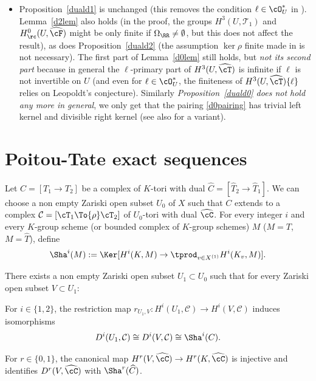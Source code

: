 \begin{rema}
\begin{itemize}
\item Proposition~\ref{duald1} is unchanged (this removes the condition $\ell
\in \cO_U^*$ in \cite[Cor.\,4.7]{demphd}).
Lemma~\ref{d2lem} also holds
(in the proof, the groups $H^3(U,\mathcal T_1)$ and
$H^0_\rc(U,\widehat \cF)$ might be only finite if
$\Omega_{\RR} \neq \emptyset$, but this does not affect the result),
as does Proposition~\ref{duald2} (the assumption $\ker \rho$ finite
made in \cite[Lem.\,5.13]{demphd} is not necessary).
The first part of Lemma~\ref{d0lem} still holds,
but \emph{not its second part} because in general the $\ell$-primary part
of $H^3(U,\widehat \cT)$ is infinite if $\ell$ is not invertible
on $U$ (and even for $\ell \in \cO_U^*$, the finiteness of
$H^3(U,\widehat \cT)\{\ell\}$ relies on Leopoldt's conjecture).
Similarly \emph{Proposition~\ref{duald0} does not hold any more
in general}, we only get that the pairing \eqref{d0pairing}
has trivial left kernel and
divisible right kernel (see also \cite[\S5.4]{demphd} for
a variant).
\end{itemize}
\end{rema}

\section{Poitou-Tate exact sequences} \label{three}

Let $C=[T_1 \to T_2]$ be a complex of $K$-tori with dual
$\widehat C=[\widehat T_2 \to \widehat T_1]$. We can choose a non empty
Zariski open subset $U_0$ of $X$ such that $C$ extends to a complex
$\mathcal C=[\cT_1 \To{\rho}\cT_2]$
of $U_0$-tori with dual
$\widehat \cC$. For every integer $i$ and every $K$-group
scheme (or bounded complex of $K$-group schemes)
$M$ (\eg $M=T$, $M=\widehat T$), define
\[
\Sha^i(M):=\Ker [H^i(K,M) \to \tprod_{v \in X^{(1)}} H^i(K_v,M)].
\]

\begin{lem} \label{shad1}
There exists a non empty Zariski open subset $U_1 \subset U_0$
such that for every Zariski open subset $V \subset U_1$:
\begin{enumeratea}
\item\label{shad1a}
For $i \in \{1, 2\}$,
the restriction map $r_{U_1,V}: H^i(U_1,\mathcal C) \to H^i(V,\mathcal C)$
induces isomorphisms
\[
D^i(U_1,\mathcal C) \cong D^i(V,\mathcal C) \cong \Sha^i(C).
\]

\item\label{shad1b}
For $r \in \{0, 1\}$,
the canonical map $H^r(V, \widehat \cC) \to H^r(K,
{\widehat \cC})$ is injective and identifies $D^r(V,\widehat \cC)$
with $\Sha^r(\widehat C)$.
\end{enumeratea}
\end{lem}

